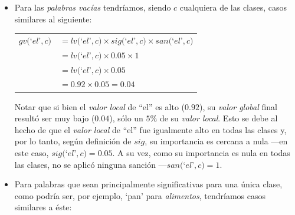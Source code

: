 \begin{itemize}
    \item {
        Para las \emph{palabras vacías} tendríamos, siendo $c$ cualquiera de las clases, casos similares al siguiente:

        \vspace{5mm}

        \begin{tabular}{l@{}l}%
            $gv($`$el$'$, c)$  & $= lv($`$el$'$, c)\times sig($`$el$'$, c)\times san($`$el$'$, c)$\\
                            & $= lv($`$el$'$, c)\times 0.05\times 1$\\
                            & $= lv($`$el$'$, c)\times 0.05$\\
                            & $= 0.92\times 0.05 = 0.04$
        \end{tabular}

        \vspace{5mm}

        Notar que si bien el \emph{valor local} de ``el'' es alto ($0.92$), su \emph{valor global} final resultó ser muy bajo ($0.04$), sólo un $5\%$ de su \emph{valor local}.
        Esto se debe al hecho de que el \emph{valor local} de ``el'' fue igualmente alto en todas las clases y, por lo tanto, según definición de $sig$, su importancia es cercana a nula ---en este caso, $sig($`$el$'$, c) = 0.05$. A su vez, como su importancia es nula en todas las clases, no se aplicó ninguna sanción ---$san($`$el$'$, c)=1$.
    }
    \vspace{5mm}
    \item {
        Para palabras que sean principalmente significativas para una única clase, como podría ser, por ejemplo, `pan' para \emph{alimentos}, tendríamos casos similares a éste:

        \vspace{5mm}
        
}
\end{itemize}
